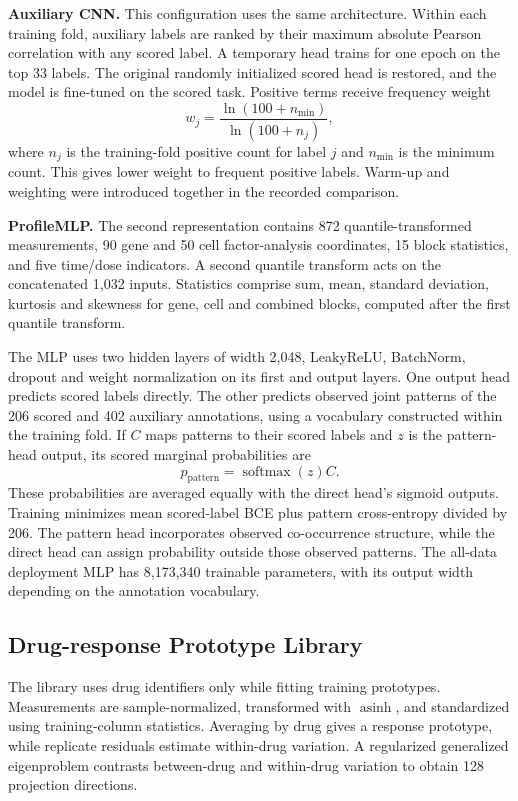 \documentclass[journal]{IEEEtran}
\begin{document}
\textbf{Auxiliary CNN.} This configuration uses the same architecture. Within each training fold, auxiliary labels are ranked by their maximum absolute Pearson correlation with any scored label. A temporary head trains for one epoch on the top 33 labels. The original randomly initialized scored head is restored, and the model is fine-tuned on the scored task. Positive terms receive frequency weight
\begin{equation}
w_j=\frac{\ln(100+n_{\min})}{\ln(100+n_j)},
\end{equation}
where $n_j$ is the training-fold positive count for label $j$ and $n_{\min}$ is the minimum count. This gives lower weight to frequent positive labels. Warm-up and weighting were introduced together in the recorded comparison.

\textbf{ProfileMLP.} The second representation contains 872 quantile-transformed measurements, 90 gene and 50 cell factor-analysis coordinates, 15 block statistics, and five time/dose indicators. A second quantile transform acts on the concatenated 1,032 inputs. Statistics comprise sum, mean, standard deviation, kurtosis and skewness for gene, cell and combined blocks, computed after the first quantile transform.

The MLP uses two hidden layers of width 2,048, LeakyReLU, BatchNorm, dropout and weight normalization on its first and output layers. One output head predicts scored labels directly. The other predicts observed joint patterns of the 206 scored and 402 auxiliary annotations, using a vocabulary constructed within the training fold. If $C$ maps patterns to their scored labels and $z$ is the pattern-head output, its scored marginal probabilities are
\begin{equation}
p_{\mathrm{pattern}}=\operatorname{softmax}(z)C.
\end{equation}
These probabilities are averaged equally with the direct head's sigmoid outputs. Training minimizes mean scored-label BCE plus pattern cross-entropy divided by 206. The pattern head incorporates observed co-occurrence structure, while the direct head can assign probability outside those observed patterns. The all-data deployment MLP has 8,173,340 trainable parameters, with its output width depending on the annotation vocabulary.

\subsection{Drug-response Prototype Library}
The library uses drug identifiers only while fitting training prototypes. Measurements are sample-normalized, transformed with $\operatorname{asinh}$, and standardized using training-column statistics. Averaging by drug gives a response prototype, while replicate residuals estimate within-drug variation. A regularized generalized eigenproblem contrasts between-drug and within-drug variation to obtain 128 projection directions.
\end{document}
